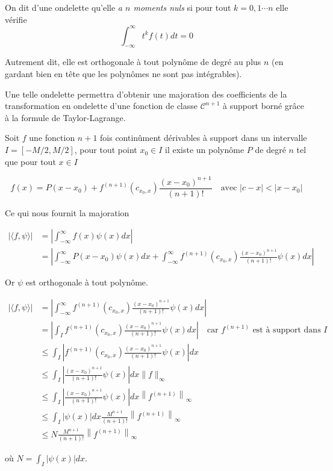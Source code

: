 	\begin{mydef}
		On dit d'une ondelette qu'elle \textit{a $n$ moments nuls} si pour tout $k = 0, 1 \cdots n$ elle vérifie $$\int_{-\infty}^{\infty} t^k f(t) dt = 0$$
		
		Autrement dit, elle est orthogonale à tout polynôme de degré au plus $n$ (en gardant bien en tête que les polynômes ne sont pas intégrables).
	\end{mydef}
		
	Une telle ondelette permettra d'obtenir une majoration des coefficients de la transformation en ondelette d'une fonction de classe $\mathcal{C}^{n+1}$ à support borné grâce à la formule de Taylor-Lagrange.
	
	Soit $f$ une fonction $n+1$ fois continûment dérivables à support dans un intervalle $I = [-M/2, M/2]$, pour tout point $x_0 \in I$ il existe un polynôme $P$ de degré $n$ tel que pour tout $x \in I$ 
	
	$$f(x) = P(x - x_0) + f^{(n+1)}(c_{x_0, x}) \frac{(x-x_0)^{n+1}}{(n+1)!} \quad \text{avec } |c - x| < |x - x_0|$$
	
	Ce qui nous fournit la majoration
	
	\begin{align*}
		|\langle f, \psi \rangle| &= \left|\int_{-\infty}^{\infty} f(x) \psi(x) dx \right| \\
		&= \left| \int_{-\infty}^{\infty}P(x - x_0) \psi(x) dx + \int_{-\infty}^{\infty} f^{(n+1)}(c_{x_0, x}) \frac{(x-x_0)^{n+1}}{(n+1)!} \psi(x) dx  \right|
	\end{align*}

	Or $\psi$ est orthogonale à tout polynôme.

	\begin{align*}
		|\langle f, \psi \rangle| &= \left| \int_{-\infty}^{\infty} f^{(n+1)}(c_{x_0, x}) \frac{(x-x_0)^{n+1}}{(n+1)!} \psi(x) dx  \right| \\
		&= \left| \int_{I} f^{(n+1)}(c_{x_0, x}) \frac{(x-x_0)^{n+1}}{(n+1)!} \psi(x) dx  \right| \quad \text{car $f^{(n+1)}$ est à support dans $I$} \\
		& \leqslant \int_{I} \left| f^{(n+1)}(c_{x_0, x}) \frac{(x-x_0)^{n+1}}{(n+1)!} \psi(x) \right| dx \\
		& \leqslant \int_{I} \left| \frac{(x-x_0)^{n+1}}{(n+1)!} \psi(x) \right| dx \|f\|_{\infty} \\
		& \leqslant \int_{I} \left| \frac{(x-x_0)^{n+1}}{(n+1)!} \psi(x) \right| dx \left\|f^{(n+1)}\right\|_{\infty} \\
		& \leqslant \int_{I} \left| \psi(x) \right| dx \frac{M^{n+1}}{(n+1)!} \left\|f^{(n+1)}\right\|_{\infty} \\
		& \leqslant N \frac{M^{n+1}}{(n+1)!} \left\|f^{(n+1)}\right\|_{\infty}
	\end{align*}
	
	où $N = \int_{I} \left| \psi(x) \right| dx $.
